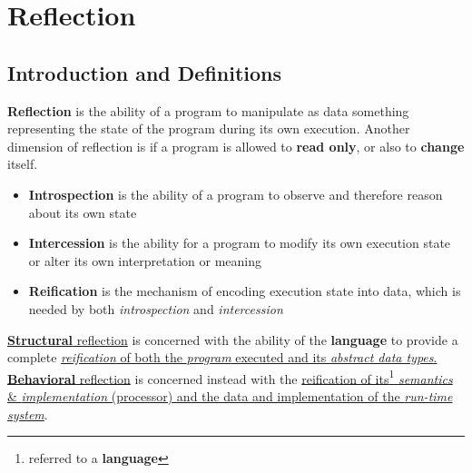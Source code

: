 \chapter{Reflection}
\section{Introduction and Definitions}

\textbf{Reflection} is the ability of a program to manipulate as data something representing the state of the program during its own execution.
Another dimension of reflection is if a program is
allowed to \textbf{read only}, or also to \textbf{change} itself.
\begin{itemize}
    \item \textbf{Introspection} is the ability of a program to observe and
    therefore reason about its own state
    \item \textbf{Intercession} is the ability for a program to modify its
    own execution state or alter its own interpretation or
    meaning
    \item \textbf{Reification} is the mechanism of encoding execution state into data, which is needed by both \textit{introspection} and \textit{intercession}
\end{itemize}

\ul{\textbf{Structural} reflection}  is concerned with the ability of the \textbf{language} to provide a complete \ul{\textit{reification} of both the \textit{program} executed and its \textit{abstract data types}.}\\
\ul{\textbf{Behavioral} reflection} is concerned instead with the \ul{reification of its\footnote{referred to a \textbf{language}} \textit{semantics} \& \textit{implementation} (processor) and the data and implementation of the \textit{run-time system}}.

